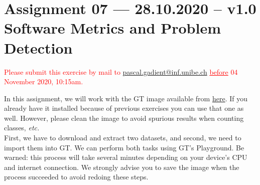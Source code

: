 \documentclass [11pt, a4wide, twoside]{article}
\begin{document}
\section*{Assignment 07 --- 28.10.2020 -- v1.0\\Software Metrics and Problem Detection}

\textcolor{red}{Please submit this exercise by mail to \href{mailto:pascal.gadient@inf.unibe.ch}{pascal.gadient@inf.unibe.ch} \underline{before} 04 November 2020, 10:15am.}
\newline\newline

\noindent In this assignment, we will work with the GT image available from \href{https://gtoolkit.com/}{here}. If you already have it installed because of previous exercises you can use that one as well. However, please clean the image to avoid spurious results when counting classes, \emph{etc.}\\

\noindent First, we have to download and extract two datasets, and second, we need to import them into GT. We can perform both tasks using GT's Playground. Be warned: this process will take several minutes depending on your device's CPU and internet connection. We strongly advise you to save the image when the process succeeded to avoid redoing these steps.\\
\end{document}
